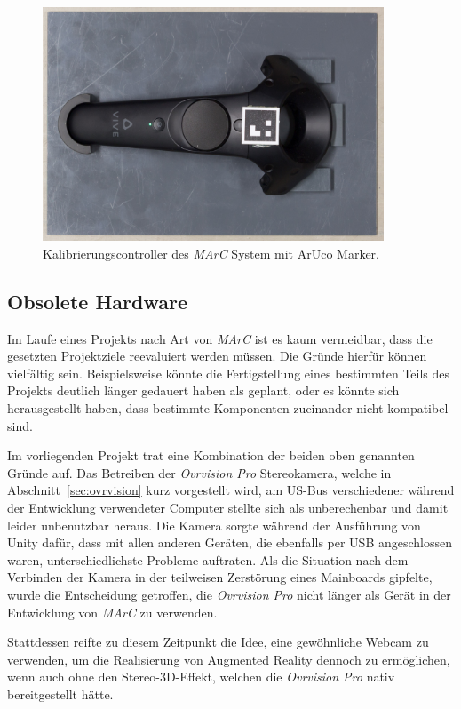 	\begin{figure}[H]
		\centering
		\includegraphics[width=4in]{Bilder/Eigene Fotos/IMG_0032.jpg}
		\caption{Kalibrierungscontroller des \textit{MArC} System mit ArUco Marker.}
		\label{fig:KontrollerMarc}
	\end{figure}
	
\subsection{Obsolete Hardware}\label{sec:obsoleteHardware}
Im Laufe eines Projekts nach Art von \emph{MArC} ist es kaum vermeidbar, dass die gesetzten Projektziele reevaluiert werden müssen. Die Gründe hierfür können vielfältig sein. Beispielsweise könnte die Fertigstellung eines bestimmten Teils des Projekts deutlich länger gedauert haben als geplant, oder es könnte sich herausgestellt haben, dass bestimmte Komponenten zueinander nicht kompatibel sind.

Im vorliegenden Projekt trat eine Kombination der beiden oben genannten Gründe auf. Das Betreiben der \emph{Ovrvision Pro} Stereokamera, welche in Abschnitt~\ref{sec:ovrvision} kurz vorgestellt wird, am US-Bus verschiedener während der Entwicklung verwendeter Computer stellte sich als unberechenbar und damit leider unbenutzbar heraus. Die Kamera sorgte während der Ausführung von Unity dafür, dass mit allen anderen Geräten, die ebenfalls per USB angeschlossen waren, unterschiedlichste Probleme auftraten. Als die Situation nach dem Verbinden der Kamera in der teilweisen Zerstörung eines Mainboards gipfelte, wurde die Entscheidung getroffen, die \emph{Ovrvision Pro} nicht länger als Gerät in der Entwicklung von \emph{MArC} zu verwenden.

Stattdessen reifte zu diesem Zeitpunkt die Idee, eine gewöhnliche Webcam zu verwenden, um die Realisierung von Augmented Reality dennoch zu ermöglichen, wenn auch ohne den Stereo-3D-Effekt, welchen die \emph{Ovrvision Pro} nativ bereitgestellt hätte.

